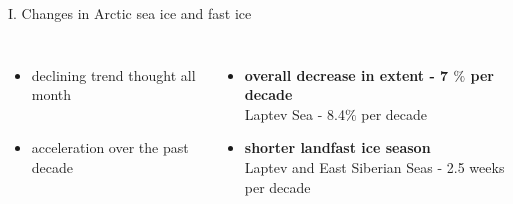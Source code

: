 \documentclass[8pt]{beamer}
\begin{document}
\begin{frame}[fragile]{I. Changes in Arctic sea ice and fast ice}
\begin{columns}
		
	\end{columns}
	
	\begin{columns}
		\begin{itemize}
			\item declining trend thought all month\\~\\
			\item acceleration over the past decade
		\end{itemize}
		\begin{itemize}
			\item \textbf{overall decrease in extent - 7 $\%$ per decade}\\
			Laptev Sea - 8.4$\%$ per decade
			
			\item \textbf{shorter landfast ice season\\}
			Laptev and East Siberian Seas - 2.5 weeks per decade
		\end{itemize}
	\end{columns}
	
\end{frame}
\end{document}
